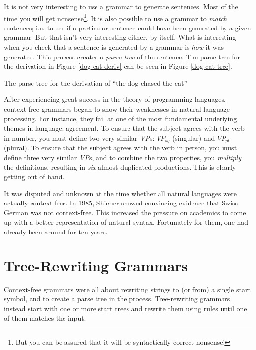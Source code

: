 \documentclass[12pt]{article}
\newcommand{\defn}[1]{\textit{#1}}
\begin{document}
It is not very interesting to use a grammar to generate sentences.  Most
of the time you will get nonsense\footnote{But you can be assured that
it will be syntactically correct nonsense!}.  It is also possible to use
a grammar to \textit{match} sentences; i.e. to see if a particular
sentence could have been generated by a given grammar.   But that isn't
very interesting either, by itself.  What is interesting when you
check that a sentence is generated by a grammar is \textit{how} it was
generated.  This process creates a \defn{parse tree} of the sentence.
The parse tree for the derivation in Figure \ref{dog-cat-deriv} can be
seen in Figure \ref{dog-cat-tree}.

\begin{Figure}
\caption{The parse tree for the derivation of ``the dog chased the
cat''}
\label{dog-cat-tree}
\end{Figure}

After experiencing great success in the theory of programming languages,
context-free grammars began to show their weaknesses in natural language
processing.  For instance, they fail at one of the most fundamental
underlying themes in language: agreement.  To ensure that the subject
agrees with the verb in number, you must define two very similar
\textit{VP}s: $\mathit{VP}_\mathit{sg}$ (singular) and
$\mathit{VP}_\mathit{pl}$ (plural).  To ensure that the subject agrees
with the verb in person, you must define three very similar
\textit{VP}s, and to combine the two properties, you \textit{multiply}
the definitions, resulting in \textit{six} almost-duplicated
productions.  This is clearly getting out of hand.

It was disputed and unknown at the time whether all natural languages
were actually context-free.  In 1985, Shieber\cite{Shieber-1985} showed
convincing evidence that Swiss German was not context-free.  This
increased the pressure on academics to come up with a better
representation of natural syntax.  Fortunately for them, one had already
been around for ten years.

\section{Tree-Rewriting Grammars}

Context-free grammars were all about rewriting strings to (or from) a
single start symbol, and to create a parse tree in the process.
Tree-rewriting grammars instead start with one or more start trees and
rewrite them using rules until one of them matches the input. 
\end{document}
